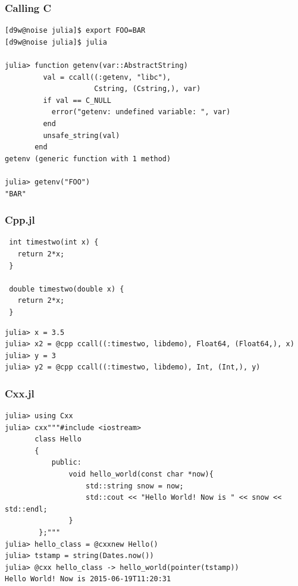 \begin{frame}[fragile]
	\frametitle{Calling C}
  \begin{tiny}
  \begin{verbatim}
[d9w@noise julia]$ export FOO=BAR
[d9w@noise julia]$ julia

julia> function getenv(var::AbstractString)
         val = ccall((:getenv, "libc"),
                     Cstring, (Cstring,), var)
         if val == C_NULL
           error("getenv: undefined variable: ", var)
         end
         unsafe_string(val)
       end
getenv (generic function with 1 method)

julia> getenv("FOO")
"BAR"
  \end{verbatim}
  \end{tiny}
\end{frame}

\begin{frame}[fragile]
	\frametitle{Cpp.jl}
  \begin{tiny}
  \begin{verbatim}
 int timestwo(int x) {
   return 2*x;
 }

 double timestwo(double x) {
   return 2*x;
 }
  \end{verbatim}
  \begin{verbatim}
julia> x = 3.5
julia> x2 = @cpp ccall((:timestwo, libdemo), Float64, (Float64,), x)
julia> y = 3
julia> y2 = @cpp ccall((:timestwo, libdemo), Int, (Int,), y)
  \end{verbatim}
  \end{tiny}
\end{frame}

\begin{frame}[fragile]
	\frametitle{Cxx.jl}
  \begin{tiny}
  \begin{verbatim}
julia> using Cxx
julia> cxx"""#include <iostream>
       class Hello
       { 
           public:
               void hello_world(const char *now){
                   std::string snow = now;
                   std::cout << "Hello World! Now is " << snow << std::endl;
               }
        };"""
julia> hello_class = @cxxnew Hello()
julia> tstamp = string(Dates.now())
julia> @cxx hello_class -> hello_world(pointer(tstamp))
Hello World! Now is 2015-06-19T11:20:31
  \end{verbatim}
  \end{tiny}
\end{frame}

